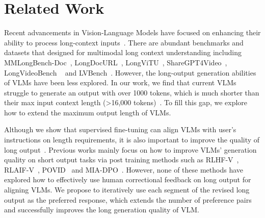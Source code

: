 \section{Related Work}

Recent advancements in Vision-Language Models have focused on enhancing their ability to process long-context inputs~\cite{ge2024v2pe,li2024giraffe,chen2024internvl}. There are abundant benchmarks and datasets that designed for multimodal long context understanding including MMLongBench-Doc~\cite{ma2024mmlongbench}, LongDocURL~\cite{deng2024longdocurl}, LongViTU~\cite{wu2025longvitu}, ShareGPT4Video~\cite{chen2024sharegpt4video}, LongVideoBench ~\cite{wu2024longvideobench} and LVBench~\cite{wang2024lvbench}. However, the long-output generation abilities of VLMs have been less explored. In our work, we find that current VLMs struggle to generate an output with over 1000 tokens, which is much shorter than their max input context length (>16,000 tokens)~\cite{wang2024qwen2}. To fill this gap, we explore how to extend the maximum output length of VLMs.


Although we show that supervised fine-tuning can align VLMs with user's instructions on length requirements, it is also important to improve the quality of long output~\cite{wu2024longgenbench}. Previous works mainly focus on how to improve VLMs' generation quality on short output tasks via post training methods such as RLHF-V~\cite{yu2024rlhf}, RLAIF-V~\cite{yu2024rlaif}, POVID~\cite{zhou2024aligning} and MIA-DPO~\cite{liu2024mia}. However, none of these methods have explored how to effectively use human correctional feedback on long output for aligning VLMs. We propose to iteratively use each segment of the revised long output as the preferred response, which extends the number of preference pairs and successfully improves the long generation quality of VLM.


\begin{table}[t]
\centering
{}
\caption{Scores (\%) on MMLongBench-Write for models trained under different conditions, where $S$, $S_l$ and $S_q$ is the overall, length and quality score on all tasks and $S_{PPT}$ is the overall score on the PPT script task.}
\label{tb:mem}
\end{table}
